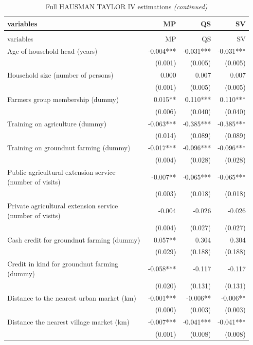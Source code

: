 \documentclass[
]{article}
\begin{document}
\begin{longtable}[t]{lrrr}
\caption{\label{tab:unnamed-chunk-18}Full HAUSMAN TAYLOR IV estimations}\\
\toprule
variables & MP & QS & SV\\
\midrule
\endfirsthead
\caption[]{\label{tab:unnamed-chunk-18}Full HAUSMAN TAYLOR IV estimations \textit{(continued)}}\\
\toprule
variables & MP & QS & SV\\
\midrule
\endhead

\endfoot
\bottomrule
\endlastfoot
Age of household head (years) & -0.004*** & -0.031*** & -0.031***\\
 & (0.001) & (0.005) & (0.005)\\
Household size (number of persons) & 0.000 & 0.007 & 0.007\\
 & (0.001) & (0.005) & (0.005)\\
Farmers group membership (dummy) & 0.015** & 0.110*** & 0.110***\\
 & (0.006) & (0.040) & (0.040)\\
Training on agriculture (dummy) & -0.063*** & -0.385*** & -0.385***\\
 & (0.014) & (0.089) & (0.089)\\
Training on groundnut farming (dummy) & -0.017*** & -0.096*** & -0.096***\\
 & (0.004) & (0.028) & (0.028)\\
Public agricultural extension service (number of visits) & -0.007** & -0.065*** & -0.065***\\
 & (0.003) & (0.018) & (0.018)\\
Private agricultural extension service (number of visits) & -0.004 & -0.026 & -0.026\\
 & (0.004) & (0.027) & (0.027)\\
Cash credit for groundnut farming (dummy) & 0.057** & 0.304 & 0.304\\
 & (0.029) & (0.188) & (0.188)\\
Credit in kind for groundnut farming (dummy) & -0.058*** & -0.117 & -0.117\\
 & (0.020) & (0.131) & (0.131)\\
Distance to the nearest urban market (km) & -0.001*** & -0.006** & -0.006**\\
 & (0.000) & (0.003) & (0.003)\\
Distance the nearest village market (km) & -0.007*** & -0.041*** & -0.041***\\
 & (0.001) & (0.008) & (0.008)\\

\end{longtable}
\end{document}
